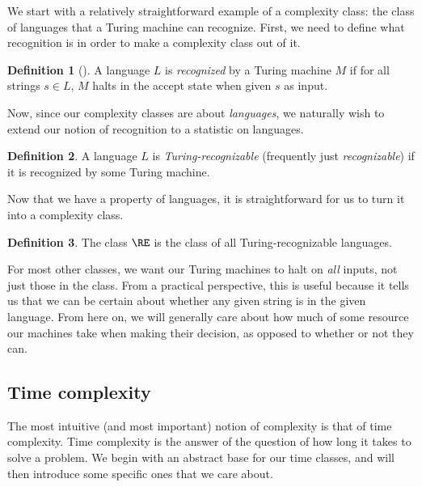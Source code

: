 \documentclass[english,12pt]{reedthesis}
\theoremstyle{plain}
\theoremstyle{definition}
\newtheorem{defn}[defn]{Definition}
\theoremstyle{remark}
\begin{document}
We start with a relatively straightforward example of a complexity class: the
class of languages that a Turing machine can recognize. First, we need to
define what recognition is in order to make a complexity class out of it.

\begin{defn}[{\cite[Def.\ 3.2]{Sip97}}]\label{def:recognition}
  A language $L$ is \emph{recognized} by a Turing machine $M$ if for all strings
  $s \in L$, $M$ halts in the accept state when given $s$ as input.
\end{defn}

Now, since our complexity classes are about \emph{languages}, we naturally wish
to extend our notion of recognition to a statistic on languages.

\begin{defn}\label{def:turing-recognizable}
  A language $L$ is \emph{Turing-recognizable} (frequently just
  \emph{recognizable}) if it is recognized by some Turing machine.
\end{defn}

Now that we have a property of languages, it is straightforward for us to turn
it into a complexity class.

\begin{defn}\label{def:re}
  The class $\RE$ is the class of all Turing-recognizable languages.
\end{defn}

For most other classes, we want our Turing machines to halt on \emph{all}
inputs, not just those in the class. From a practical perspective, this is
useful because it tells us that we can be certain about whether any given string
is in the given language. From here on, we will generally care about how much of
some resource our machines take when making their decision, as opposed to
whether or not they can.

\subsection{Time complexity}

The most intuitive (and most important) notion of complexity is that of time
complexity. Time complexity is the answer of the question of how long it takes
to solve a problem. We begin with an abstract base for our time classes, and
will then introduce some specific ones that we care about.
\end{document}
